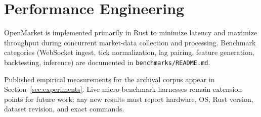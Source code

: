 \section{Performance Engineering}
\label{sec:performance}

OpenMarket is implemented primarily in Rust to minimize latency and maximize
throughput during concurrent market-data collection and processing. Benchmark
categories (WebSocket ingest, tick normalization, lag pairing, feature
generation, backtesting, inference) are documented in \texttt{benchmarks/README.md}.

Published empirical measurements for the archival corpus appear in
Section~\ref{sec:experiments}. Live micro-benchmark harnesses remain extension
points for future work; any new results must report hardware, OS, Rust version,
dataset revision, and exact commands.